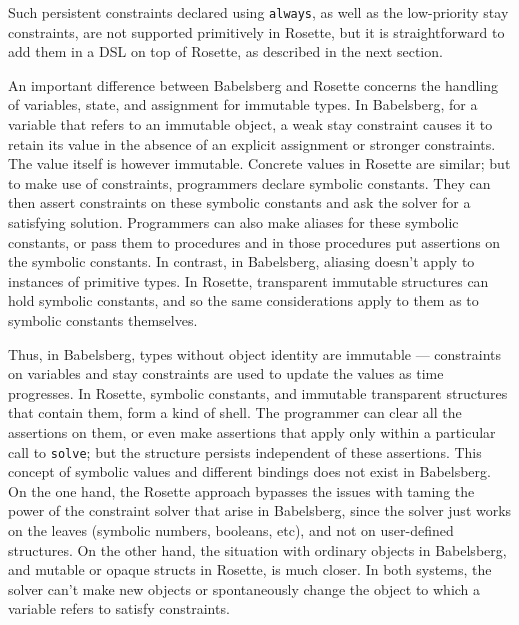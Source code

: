 \documentclass[reprint]{sigplanconf}
\begin{document}
Such persistent constraints declared using \verb|always|, as well as
the low-priority stay constraints, are not supported primitively in
Rosette, but it is straightforward to add them in a DSL on top of
Rosette, as described in the next section.

An important difference between Babelsberg and Rosette concerns the
handling of variables, state, and assignment for immutable types.  In
Babelsberg, for a variable that refers to an immutable object, a weak stay
constraint causes it to retain its value in the absence of an explicit
assignment or stronger constraints.  The value itself is however immutable.
Concrete values in Rosette are similar; but to make use of constraints,
programmers declare symbolic constants.  They can then assert constraints
on these symbolic constants and ask the solver for a satisfying solution.
Programmers can also make aliases for these symbolic constants, or pass
them to procedures and in those procedures put assertions on the symbolic
constants.  In contrast, in Babelsberg, aliasing doesn't apply to instances
of primitive types.  In Rosette, transparent immutable structures can hold
symbolic constants, and so the same considerations apply to them as to
symbolic constants themselves.  

Thus, in Babelsberg, types without object identity are immutable ---
constraints on variables and stay constraints are used to update the values
as time progresses.  In Rosette, symbolic constants, and immutable
transparent structures that contain them, form a kind of shell.  The
programmer can clear all the assertions on them, or even make assertions
that apply only within a particular call to \verb|solve|; but the structure
persists independent of these assertions.
This concept of symbolic
values and different bindings does not exist in Babelsberg.  On the one
hand, the Rosette approach bypasses the issues with taming the power of the
constraint solver that arise in Babelsberg, since the solver just works on
the leaves (symbolic numbers, booleans, etc), and not on user-defined
structures.  On the other hand, the situation with ordinary objects in
Babelsberg, and mutable or opaque structs in Rosette, is much closer.  In
both systems, the solver can't make new objects or spontaneously change the
object to which a variable refers to satisfy constraints.


\end{document}
